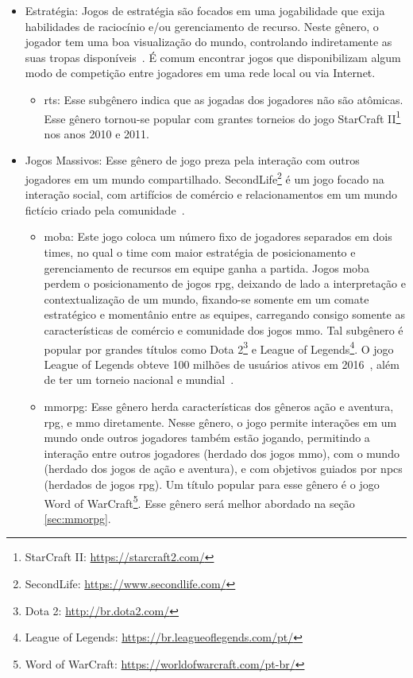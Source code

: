 \begin{itemize}
  \item Estratégia: Jogos de estratégia são focados em uma jogabilidade que exija habilidades de raciocínio e/ou gerenciamento de recurso. Neste gênero, o jogador tem uma boa visualização do mundo, controlando indiretamente as suas tropas disponíveis~\cite{rollings2003andrew}. É comum encontrar jogos que disponibilizam algum modo de competição entre jogadores em uma rede local ou via Internet.
    \begin{itemize}
      \item \ac{rts}: Esse subgênero indica que as jogadas dos jogadores não são atômicas. Esse gênero tornou-se popular com grantes torneios do jogo StarCraft II\footnote{StarCraft II: \url{https://starcraft2.com/}} nos anos 2010 e 2011.
    \end{itemize}
  \item Jogos Massivos: Esse gênero de jogo preza pela interação com outros jogadores em um mundo compartilhado. SecondLife\footnote{SecondLife: \url{https://www.secondlife.com/}} é um jogo focado na interação social, com artifícios de comércio e relacionamentos em um mundo fictício criado pela comunidade~\cite{tecmundo_secondlife}.
    \begin{itemize}
      \item \ac{moba}: Este jogo coloca um número fixo de jogadores separados em dois times, no qual o time com maior estratégia de posicionamento e gerenciamento de recursos em equipe ganha a partida. Jogos \ac{moba} perdem o posicionamento de jogos \ac{rpg}, deixando de lado a interpretação e contextualização de um mundo, fixando-se somente em um comate estratégico e momentânio entre as equipes, carregando consigo somente as características de comércio e comunidade dos jogos \ac{mmo}. Tal subgênero é popular por grandes títulos como Dota 2\footnote{Dota 2: \url{http://br.dota2.com/}} e League of Legends\footnote{League of Legends: \url{https://br.leagueoflegends.com/pt/}}. O jogo League of Legends obteve 100 milhões de usuários ativos em 2016~\cite{lol_statista}, além de ter um torneio nacional e mundial~\cite{lol_sportv}.
      \item \ac{mmorpg}: Esse gênero herda características dos gêneros ação e aventura, \ac{rpg}, e \ac{mmo} diretamente. Nesse gênero, o jogo permite interações em um mundo onde outros jogadores também estão jogando, permitindo a interação entre outros jogadores (herdado dos jogos \ac{mmo}), com o mundo (herdado dos jogos de ação e aventura), e com objetivos guiados por \ac{npcs} (herdados de jogos \ac{rpg}). Um título popular para esse gênero é o jogo Word of WarCraft\footnote{Word of WarCraft: \url{https://worldofwarcraft.com/pt-br/}}. Esse gênero será melhor abordado na seção \ref{sec:mmorpg}.

\end{itemize}
\end{itemize}

